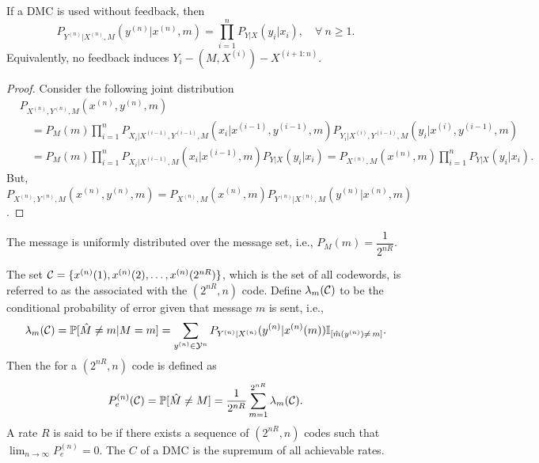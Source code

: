 \documentclass[11pt,a4paper]{article}
\begin{document}
\begin{lemma}
    If a DMC is used without feedback, then 
    \begin{equation*}
        P_{Y^{(n)}|X^{(n)},M}(y^{(n)}|x^{(n)},m) = \prod_{i=1}^{n} P_{Y|X}(y_i|x_i),\quad \forall\ n\ge 1.
    \end{equation*}
    Equivalently, no feedback induces $Y_i - (M,X^{(i)}) - X^{(i+1:n)}$.
\end{lemma}

\begin{proof}
    Consider the following joint distribution
    \begin{align*}
        &P_{X^{(n)},Y^{(n)},M}(x^{(n)},y^{(n)},m) \\
        &\quad = P_M(m) \prod_{i=1}^{n} P_{X_i|X^{(i-1)},Y^{(i-1)},M}(x_i|x^{(i-1)},y^{(i-1)},m) P_{Y_i|X^{(i)},Y^{(i-1)},M}(y_i|x^{(i)},y^{(i-1)},m) \\
        &\quad = P_M(m) \prod_{i=1}^{n} P_{X_i|X^{(i-1)},M}(x_i|x^{(i-1)},m) P_{Y|X}(y_i|x_i) = P_{X^{(n)},M}(x^{(n)},m) \prod_{i=1}^{n} P_{Y|X}(y_i|x_i).
    \end{align*}
    But, $P_{X^{(n)},Y^{(n)},M}(x^{(n)},y^{(n)},m) = P_{X^{(n)},M}(x^{(n)},m) P_{Y^{(n)}|X^{(n)},M}(y^{(n)}|x^{(n)},m)$.
\end{proof}

\begin{assume}\label{assume:channel_coding}
    The message is uniformly distributed over the message set, i.e., $P_M(m) = \dfrac{1}{2^{nR}}$.
\end{assume}

\begin{definition}
    The set $\mathcal{C} = \{x^{(n)}(1),x^{(n)}(2),\ldots,x^{(n)}(2^{nR})\}$, which is the set of all codewords, is referred to as the  associated with the $(2^{nR},n)$ code. Define $\lambda_m(\mathcal{C})$ to be the conditional probability of error given that message $m$ is sent, i.e.,
    \begin{equation*}
        \lambda_m(\mathcal{C}) = \mathbb{P}[\hat{M}\neq m | M = m] = \sum_{y^{(n)}\in\mathcal{Y}^n} P_{Y^{(n)}|X^{(n)}}(y^{(n)}|x^{(n)}(m)) \mathbb{I}_{[\hat{m}(y^{(n)})\neq\, m]}.
    \end{equation*}
    Then the  for a $(2^{nR}, n)$ code is defined as 
    \begin{equation*}
        P^{(n)}_e(\mathcal{C}) = \mathbb{P}[\hat{M}\neq M] = \dfrac{1}{2^{nR}} \sum_{m=1}^{2^{nR}} \lambda_m(\mathcal{C}).   
    \end{equation*}
    A rate $R$ is said to be  if there exists a sequence of $(2^{nR}, n)$ codes such that $\lim_{n\rightarrow \infty} P_e^{(n)} = 0$. The  $C$ of a DMC is the supremum of all achievable rates.
\end{definition}
\end{document}

